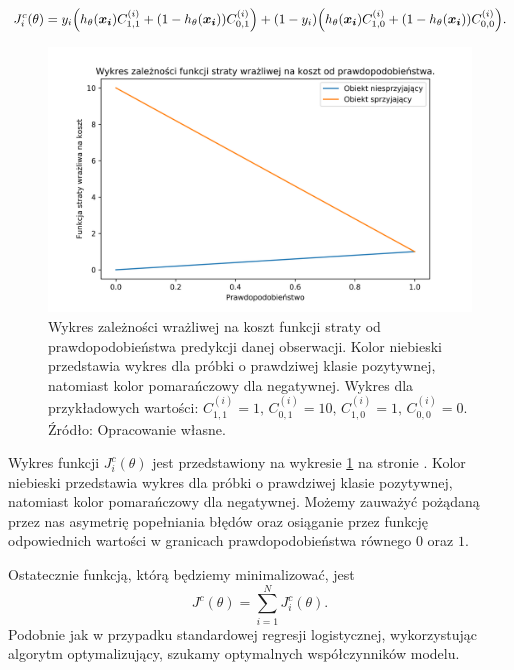 \documentclass[inzynierska]{pwr_wmat_praca_dyplomowa}
\theoremstyle{plain}
\numberwithin{theorem}{chapter}
\theoremstyle{definition}
\numberwithin{theorem}{chapter}
\begin{document}
$$ J^c_i(\theta) = y_i \Big( h_{\theta}(\boldsymbol{x_i}) C^{(i)}_{1,1} + (1 - h_{\theta}(\boldsymbol{x_i}))C^{(i)}_{0,1} \Big) + (1-y_i) \Big( h_{\theta}(\boldsymbol{x_i}) C^{(i)}_{1,0} + (1 - h_{\theta}(\boldsymbol{x_i}))C^{(i)}_{0,0} \Big) \text{.} $$


\begin{figure}[h]
	\includegraphics[width=\linewidth]{images/cost_sensitive_ce.png}
	\caption{Wykres zależności wrażliwej na koszt funkcji straty od prawdopodobieństwa predykcji danej obserwacji. Kolor niebieski przedstawia wykres dla próbki o prawdziwej klasie pozytywnej, natomiast kolor pomarańczowy dla negatywnej. Wykres dla przykładowych wartości: $C^{(i)}_{1,1} = 1 \text{, } C^{(i)}_{0,1} = 10 \text{, } C^{(i)}_{1,0} = 1 \text{, } C^{(i)}_{0,0} = 0$. Źródło: Opracowanie własne.}
	\label{fig:cost-sensitive-loss-function}
\end{figure}

Wykres funkcji $J^c_i(\theta)$ jest przedstawiony na wykresie \ref{fig:cost-sensitive-loss-function} na stronie \pageref{fig:cost-sensitive-loss-function}. Kolor niebieski przedstawia wykres dla próbki o prawdziwej klasie pozytywnej, natomiast kolor pomarańczowy dla negatywnej. Możemy zauważyć pożądaną przez nas asymetrię popełniania błędów oraz osiąganie przez funkcję odpowiednich wartości w granicach prawdopodobieństwa równego $0$ oraz $1$.

Ostatecznie funkcją, którą będziemy minimalizować, jest 
$$ J^c(\theta) = \sum_{i=1}^{N} J^c_i(\theta) \text{.} $$
Podobnie jak w przypadku standardowej regresji logistycznej, wykorzystując algorytm optymalizujący, szukamy optymalnych współczynników modelu.
\end{document}
